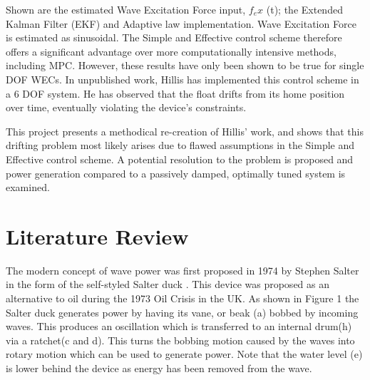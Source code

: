 \documentclass{report}
\begin{document}
Shown are the estimated Wave Excitation Force input, $f_ex$ (t); the Extended Kalman Filter (EKF) and Adaptive law implementation. Wave Excitation Force is estimated as sinusoidal. The Simple and Effective control scheme therefore offers a significant advantage over more computationally intensive methods, including MPC. However, these results have only been shown to be true for single DOF WECs. In unpublished work, Hillis has implemented this control scheme in a 6 DOF system\cite{andyMPC}. He has observed that the float drifts from its home position over time, eventually violating the device's constraints. 

This project presents a methodical re-creation of Hillis' work, and shows that this drifting problem most likely arises due to flawed assumptions in the Simple and Effective control scheme. A potential resolution to the problem is proposed and power generation compared to a passively damped, optimally tuned system is examined.

\chapter{Literature Review}
The modern concept of wave power was first proposed in 1974 by Stephen Salter in the form of the self-styled Salter duck \cite{salterDuck}. This device was proposed as an alternative to oil during the 1973 Oil Crisis in the UK. As shown in Figure 1 the Salter duck generates power by having its vane, or beak (a) bobbed by incoming waves. This produces an oscillation which is transferred to an internal drum(h) via a ratchet(c and d). This turns the bobbing motion caused by the waves into rotary motion which can be used to generate power. Note that the water level (e) is lower behind the device as energy has been removed from the wave.
\end{document}
